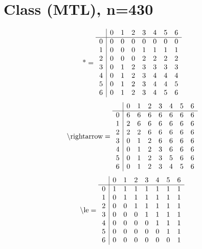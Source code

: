 \documentclass[11pt]{article}
\begin{document}
\section{Class (MTL), n=430}
\[\text{*} = 
\begin{array}{r | r r r r r r r}
 & 0 & 1 & 2 & 3 & 4 & 5 & 6 \\ \hline
0 & 0 & 0 & 0 & 0 & 0 & 0 & 0 \\
1 & 0 & 0 & 0 & 1 & 1 & 1 & 1 \\
2 & 0 & 0 & 0 & 2 & 2 & 2 & 2 \\
3 & 0 & 1 & 2 & 3 & 3 & 3 & 3 \\
4 & 0 & 1 & 2 & 3 & 4 & 4 & 4 \\
5 & 0 & 1 & 2 & 3 & 4 & 4 & 5 \\
6 & 0 & 1 & 2 & 3 & 4 & 5 & 6 \\
\end{array}
\]
\[\text{\textbackslash rightarrow} = 
\begin{array}{r | r r r r r r r}
 & 0 & 1 & 2 & 3 & 4 & 5 & 6 \\ \hline
0 & 6 & 6 & 6 & 6 & 6 & 6 & 6 \\
1 & 2 & 6 & 6 & 6 & 6 & 6 & 6 \\
2 & 2 & 2 & 6 & 6 & 6 & 6 & 6 \\
3 & 0 & 1 & 2 & 6 & 6 & 6 & 6 \\
4 & 0 & 1 & 2 & 3 & 6 & 6 & 6 \\
5 & 0 & 1 & 2 & 3 & 5 & 6 & 6 \\
6 & 0 & 1 & 2 & 3 & 4 & 5 & 6 \\
\end{array}
\]
\[\text{\textbackslash le} = 
\begin{array}{r | r r r r r r r}
 & 0 & 1 & 2 & 3 & 4 & 5 & 6 \\ \hline
0 & 1 & 1 & 1 & 1 & 1 & 1 & 1 \\
1 & 0 & 1 & 1 & 1 & 1 & 1 & 1 \\
2 & 0 & 0 & 1 & 1 & 1 & 1 & 1 \\
3 & 0 & 0 & 0 & 1 & 1 & 1 & 1 \\
4 & 0 & 0 & 0 & 0 & 1 & 1 & 1 \\
5 & 0 & 0 & 0 & 0 & 0 & 1 & 1 \\
6 & 0 & 0 & 0 & 0 & 0 & 0 & 1 \\
\end{array}
\]
\end{document}
